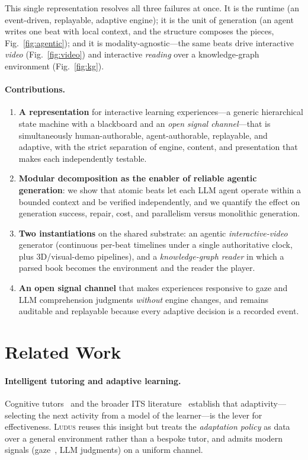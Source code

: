\documentclass[sigconf,review,anonymous]{acmart}
\newcommand{\sys}{\textsc{Ludus}\xspace}
\begin{document}
This single representation resolves all three failures at once. It is the
runtime (an event-driven, replayable, adaptive engine); it is the unit of
generation (an agent writes one beat with local context, and the structure
composes the pieces, Fig.~\ref{fig:agentic}); and it is modality-agnostic---the
same beats drive interactive \emph{video} (Fig.~\ref{fig:video}) and interactive
\emph{reading} over a knowledge-graph environment (Fig.~\ref{fig:kg}).

\paragraph{Contributions.}
\begin{enumerate}
\item \textbf{A representation} for interactive learning experiences---a
generic hierarchical state machine with a blackboard and an \emph{open signal
channel}---that is simultaneously human-authorable, agent-authorable,
replayable, and adaptive, with the strict separation of engine, content, and
presentation that makes each independently testable.
\item \textbf{Modular decomposition as the enabler of reliable agentic
generation}: we show that atomic beats let each LLM agent operate within a
bounded context and be verified independently, and we quantify the effect on
generation success, repair, cost, and parallelism versus monolithic generation.
\item \textbf{Two instantiations} on the shared substrate: an agentic
\emph{interactive-video} generator (continuous per-beat timelines under a single
authoritative clock, plus 3D/visual-demo pipelines), and a \emph{knowledge-graph
reader} in which a parsed book becomes the environment and the reader the
player.
\item \textbf{An open signal channel} that makes experiences responsive to
gaze and LLM comprehension judgments \emph{without} engine changes, and remains
auditable and replayable because every adaptive decision is a recorded event.
\end{enumerate}

\section{Related Work}

\paragraph{Intelligent tutoring and adaptive learning.} Cognitive
tutors~\cite{anderson1995cognitive} and the broader ITS
literature~\cite{vanlehn2011relative} establish that adaptivity---selecting the
next activity from a model of the learner---is the lever for effectiveness.
\sys{} reuses this insight but treats the \emph{adaptation policy} as data over a
general environment rather than a bespoke tutor, and admits modern signals
(gaze~\cite{dmello2012gaze}, LLM judgments) on a uniform channel.
\end{document}
